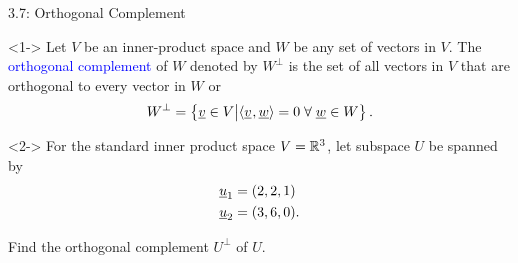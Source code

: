 \documentclass[10pt,english,aspectratio=169]{beamer}
\begin{document}
\begin{frame}{3.7: Orthogonal Complement}

\begin{definition}<1->
Let $V$ be an inner-product space and $W$ be any set of vectors in $V$.
The \textcolor{blue}{orthogonal complement} of $W$ denoted by $W^{\bot}$ is the set of all vectors in $V$ that are orthogonal to every vector in $W$ or \vspace{-2mm}
\begin{equation*}
W^{\bot} = \left\{ \underline{v} \in V \big| {\langle  \underline{v}  \mskip1mu ,  \underline{w}  \rangle} = 0 \; \forall \; \underline{w}\in W \right\}. 
\end{equation*}
\end{definition}

\begin{example}<2->
For the standard inner product space $V = \mathbb{R}^3$, let subspace $U$ be spanned by \vspace{-2mm}
\begin{align*}
\underline{u}_1 &= (2,2,1) \\
\underline{u}_2 &= (3,6,0).
\end{align*}
\vspace*{-5.5mm}

Find the orthogonal complement $U^\perp$ of $U$.
\end{example}


\end{frame}
\end{document}

